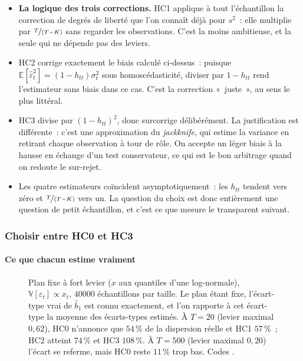 \documentclass[10pt]{beamer}
\begin{document}
\begin{notes}

  \begin{itemize}

  \item \textbf{La logique des trois corrections.} HC1 applique à tout
    l'échantillon la correction de degrés de liberté que l'on connaît déjà pour
    $s^2$~: elle multiplie par $\nicefrac{T}{(T-K)}$ sans regarder les
    observations. C'est la moins ambitieuse, et la seule qui ne dépende pas des
    leviers.\newline

  \item HC2 corrige exactement le biais calculé ci-dessus~: puisque
    $\mathbb E[\hat\varepsilon_t^2] = (1-h_{tt})\sigma_t^2$ sous
    homoscédasticité, diviser par $1-h_{tt}$ rend l'estimateur sans biais dans
    ce cas. C'est la correction «~juste~», au sens le plus littéral.\newline

  \item HC3 divise par $(1-h_{tt})^2$, donc surcorrige délibérément. La
    justification est différente~: c'est une approximation du \emph{jackknife},
    qui estime la variance en retirant chaque observation à tour de rôle. On
    accepte un léger biais à la hausse en échange d'un test conservateur, ce qui
    est le bon arbitrage quand on redoute le sur-rejet.\newline

  \item Les quatre estimateurs coïncident asymptotiquement~: les $h_{tt}$
    tendent vers zéro et $\nicefrac{T}{(T-K)}$ vers un. La question du choix est
    donc entièrement une question de petit échantillon, et c'est ce que mesure
    le transparent suivant.

  \end{itemize}

\end{notes}


\begin{frame}[c]
  \frametitle{Choisir entre HC0 et HC3}
  \framesubtitle{Ce que chacun estime vraiment}

  \begin{figure}
    \centering
    \scalebox{.42}{}
    \caption{Plan fixe à fort levier ($x$ aux quantiles d'une log-normale),
      $\mathbb V[\varepsilon_t]\propto x_t$, $40000$ échantillons par taille. Le
      plan étant fixe, l'écart-type vrai de $\hat b_1$ est connu exactement, et
      l'on rapporte à cet écart-type la moyenne des écarts-types estimés. À
      $T=20$ (levier maximal $0{,}62$), HC0 n'annonce que $54\,\%$ de la
      dispersion réelle et HC1 $57\,\%$~; HC2 atteint $74\,\%$ et HC3 $108\,\%$.
      À $T=500$ (levier maximal $0{,}20$) l'écart se referme, mais HC0 reste
      $11\,\%$ trop bas. Codes .}
  \end{figure}

\end{frame}
\end{document}
